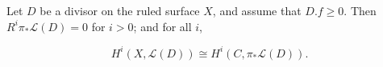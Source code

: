 Let $D$ be a divisor on the ruled surface $X$, and assume that $D.f \geq 0$. Then $R^i\pi_*\mathcal{L}(D) = 0$ for $i > 0$; and for all $i$,

$$H^i(X,\mathcal{L}(D)) \cong H^i(C,\pi_*\mathcal{L}(D)).$$
